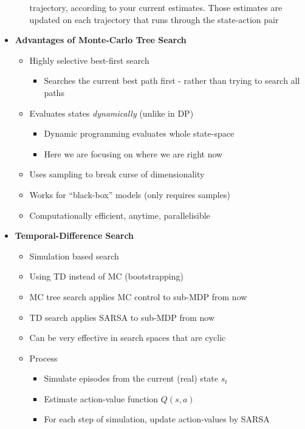 \documentclass[12pt]{article}
\begin{document}
\begin{itemize}
\begin{itemize}
      trajectory, according to your current estimates. Those estimates are updated on each trajectory
      that runs through the state-action pair
    \end{itemize}
    \item \textbf{Advantages of Monte-Carlo Tree Search}
    \begin{itemize}
      \item Highly selective best-first search
      \begin{itemize}
        \item Searches the current best path first - rather than trying to search all paths
      \end{itemize}
      \item Evaluates states \textit{dynamically} (unlike in DP)
      \begin{itemize}
        \item Dynamic programming evaluates whole state-space
        \item Here we are focusing on where we are right now
      \end{itemize}
      \item Uses sampling to break curse of dimensionality
      \item Works for ``black-box'' models (only requires samples)
      \item Computationally efficient, anytime, parallelisible
    \end{itemize}
    \item \textbf{Temporal-Difference Search}
    \begin{itemize}
      \item Simulation based search
      \item Using TD instead of MC (bootstrapping)
      \item MC tree search applies MC control to sub-MDP from now
      \item TD search applies SARSA to sub-MDP from now
      \item Can be very effective in search spaces that are cyclic
      \item Process
      \begin{itemize}
        \item Simulate episodes from the current (real) state $s_t$ 
        \item Estimate action-value function $Q(s,a)$
        \item For each step of simulation, update action-values by SARSA
        \begin{gather*}

\end{gather*}
\end{itemize}
\end{itemize}
\end{itemize}
\end{document}
